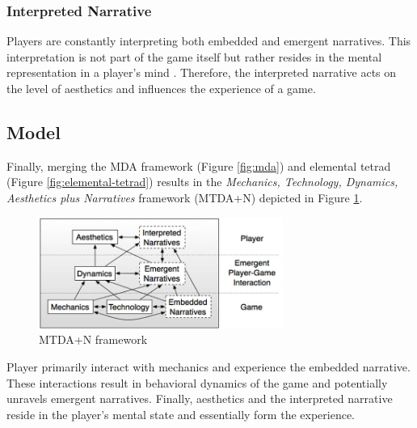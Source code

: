 \subsubsection{Interpreted Narrative}
Players are constantly interpreting both embedded and emergent narratives.
This interpretation is not part of the game itself but rather resides in the mental representation in a player's mind \cite{Ralph2014}.
Therefore, the interpreted narrative acts on the level of aesthetics and influences the experience of a game.

\subsection{Model}
Finally, merging the MDA framework (Figure \ref{fig:mda}) and elemental tetrad (Figure \ref{fig:elemental-tetrad}) results in the \textit{Mechanics, Technology, Dynamics, Aesthetics plus Narratives} framework (MTDA+N) depicted in Figure \ref{fig:mtda+n}.

\begin{figure}[H]
    \centering
    \includegraphics[width=8cm]{assets/mtda+n.jpg}
    \caption{MTDA+N framework\protect\footnotemark}
    \label{fig:mtda+n}
\end{figure}

Player primarily interact with mechanics and experience the embedded narrative.
These interactions result in behavioral dynamics of the game and potentially unravels emergent narratives.
Finally, aesthetics and the interpreted narrative reside in the player's mental state and essentially form the experience.